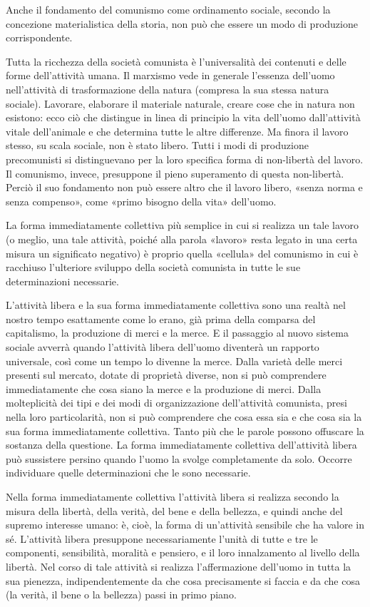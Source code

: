 \documentclass[12pt,a4paper,openany]{book}
\begin{document}
Anche il fondamento del comunismo come ordinamento sociale, secondo la concezione materialistica della storia, non può che essere un modo di produzione corrispondente.

Tutta la ricchezza della società comunista è l'universalità dei contenuti e delle forme dell'attività umana. Il marxismo vede in generale l'essenza dell'uomo nell'attività di trasformazione della natura (compresa la sua stessa natura sociale). Lavorare, elaborare il materiale naturale, creare cose che in natura non esistono: ecco ciò che distingue in linea di principio la vita dell'uomo dall'attività vitale dell'animale e che determina tutte le altre differenze. Ma finora il lavoro stesso, su scala sociale, non è stato libero. Tutti i modi di produzione precomunisti si distinguevano per la loro specifica forma di non-libertà del lavoro. Il comunismo, invece, presuppone il pieno superamento di questa non-libertà. Perciò il suo fondamento non può essere altro che il lavoro libero, «senza norma e senza compenso», come «primo bisogno della vita» dell'uomo.

La forma immediatamente collettiva più semplice in cui si realizza un tale lavoro (o meglio, una tale attività, poiché alla parola «lavoro» resta legato in una certa misura un significato negativo) è proprio quella «cellula» del comunismo in cui è racchiuso l'ulteriore sviluppo della società comunista in tutte le sue determinazioni necessarie.

L'attività libera e la sua forma immediatamente collettiva sono una realtà nel nostro tempo esattamente come lo erano, già prima della comparsa del capitalismo, la produzione di merci e la merce. E il passaggio al nuovo sistema sociale avverrà quando l'attività libera dell'uomo diventerà un rapporto universale, così come un tempo lo divenne la merce. Dalla varietà delle merci presenti sul mercato, dotate di proprietà diverse, non si può comprendere immediatamente che cosa siano la merce e la produzione di merci. Dalla molteplicità dei tipi e dei modi di organizzazione dell'attività comunista, presi nella loro particolarità, non si può comprendere che cosa essa sia e che cosa sia la sua forma immediatamente collettiva. Tanto più che le parole possono offuscare la sostanza della questione. La forma immediatamente collettiva dell'attività libera può sussistere persino quando l'uomo la svolge completamente da solo. Occorre individuare quelle determinazioni che le sono necessarie.

Nella forma immediatamente collettiva l'attività libera si realizza secondo la misura della libertà, della verità, del bene e della bellezza, e quindi anche del supremo interesse umano: è, cioè, la forma di un'attività sensibile che ha valore in sé. L'attività libera presuppone necessariamente l'unità di tutte e tre le componenti, sensibilità, moralità e pensiero, e il loro innalzamento al livello della libertà. Nel corso di tale attività si realizza l'affermazione dell'uomo in tutta la sua pienezza, indipendentemente da che cosa precisamente si faccia e da che cosa (la verità, il bene o la bellezza) passi in primo piano.
\end{document}
